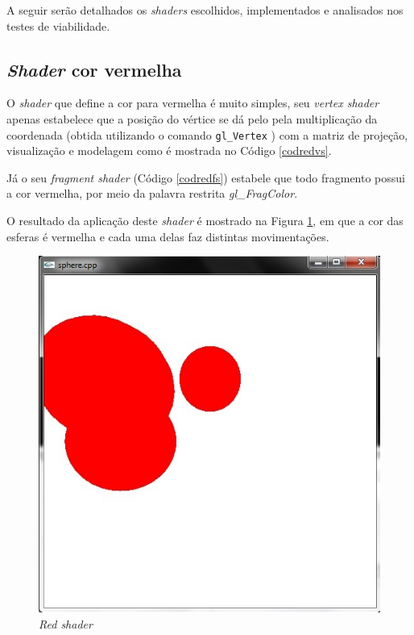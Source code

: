 	A seguir serão detalhados os \textit{shaders} escolhidos, implementados e analisados nos testes de viabilidade.

\subsection{\textit{Shader} cor vermelha}

	O \textit{shader} que define a cor para vermelha é muito simples,  seu \textit{vertex shader} apenas estabelece que a posição do vértice  se dá pelo pela multiplicação da coordenada (obtida utilizando o comando \texttt{gl\_Vertex} ) com a matriz de projeção, visualização e modelagem como é mostrada no Código \ref{codredvs}. 
	
	
	

	Já o seu \textit{fragment shader} (Código \ref{codredfs}) estabele que todo fragmento possui a cor vermelha, por meio da palavra restrita \textit{gl\_FragColor}.
	
	

	O resultado da aplicação deste \textit{shader} é mostrado na Figura \ref{red_shader}, em que a cor das esferas é vermelha e cada uma delas faz distintas movimentações. 

	\begin{figure}[h]
	\centering
		\includegraphics[keepaspectratio=true,scale=0.7]{figuras/red_shader.jpg}
	\caption{\textit{Red shader}}
	\label{red_shader}
	\end{figure}

